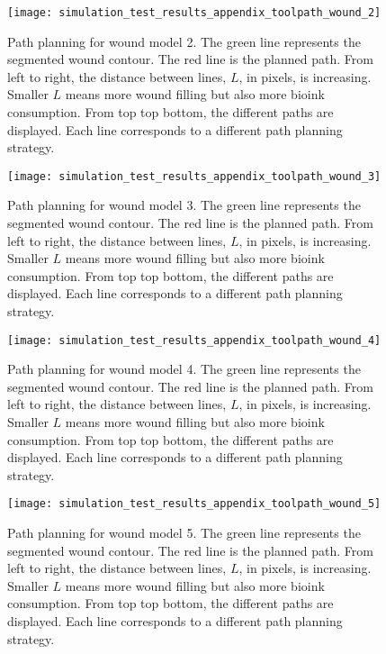 \begin{figure}[htbp]
	\centering
	\texttt{[image: simulation\_test\_results\_appendix\_toolpath\_wound\_2]}
	\caption{Path planning for wound model 2. The green line represents the segmented wound contour. The red line is the planned path. From left to right, the distance between lines, $L$, in pixels, is increasing. Smaller $L$ means more wound filling but also more bioink consumption. From top top bottom, the different paths are displayed. Each line corresponds to a different path planning strategy.}
	\label{fig:simulation_test_results_appendix_toolpath_wound_2}
\end{figure}

\begin{figure}[htbp]
	\centering
	\texttt{[image: simulation\_test\_results\_appendix\_toolpath\_wound\_3]}
	\caption{Path planning for wound model 3. The green line represents the segmented wound contour. The red line is the planned path. From left to right, the distance between lines, $L$, in pixels, is increasing. Smaller $L$ means more wound filling but also more bioink consumption. From top top bottom, the different paths are displayed. Each line corresponds to a different path planning strategy.}
	\label{fig:simulation_test_results_appendix_toolpath_wound_3}
\end{figure}

\begin{figure}[htbp]
	\centering
	\texttt{[image: simulation\_test\_results\_appendix\_toolpath\_wound\_4]}
	\caption{Path planning for wound model 4. The green line represents the segmented wound contour. The red line is the planned path. From left to right, the distance between lines, $L$, in pixels, is increasing. Smaller $L$ means more wound filling but also more bioink consumption. From top top bottom, the different paths are displayed. Each line corresponds to a different path planning strategy.}
	\label{fig:simulation_test_results_appendix_toolpath_wound_4}
\end{figure}

\begin{figure}[htbp]
	\centering
	\texttt{[image: simulation\_test\_results\_appendix\_toolpath\_wound\_5]}
	\caption{Path planning for wound model 5. The green line represents the segmented wound contour. The red line is the planned path. From left to right, the distance between lines, $L$, in pixels, is increasing. Smaller $L$ means more wound filling but also more bioink consumption. From top top bottom, the different paths are displayed. Each line corresponds to a different path planning strategy.}
	\label{fig:simulation_test_results_appendix_toolpath_wound_5}
\end{figure}

